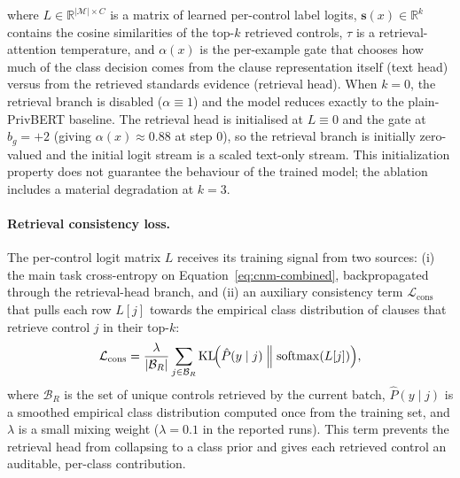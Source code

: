 \documentclass[final,3p,times,twocolumn]{elsarticle}
\begin{document}
	where $L \in \mathbb{R}^{|\mathcal{M}| \times C}$ is a matrix of learned per-control
	label logits, $\mathbf{s}(x) \in \mathbb{R}^{k}$ contains the cosine
	similarities of the top-$k$ retrieved controls, $\tau$ is a retrieval-attention
	temperature, and $\alpha(x)$ is the per-example gate that chooses how much of
	the class decision comes from the clause representation itself (text head)
	versus from the retrieved standards evidence (retrieval head). When $k = 0$,
	the retrieval branch is disabled ($\alpha \equiv 1$) and the model reduces
	exactly to the plain-PrivBERT baseline. The retrieval head is initialised at $L
	\equiv 0$ and the gate at $b_{g} = +2$ (giving $\alpha(x) \approx 0.88$ at
		step $0$), so the retrieval branch is initially zero-valued and the initial
		logit stream is a scaled text-only stream. This initialization property does
		not guarantee the behaviour of the trained model; the ablation includes a
		material degradation at $k=3$.

	\paragraph{Retrieval consistency loss.}
	The per-control logit matrix $L$ receives its training signal from two sources:
	(i) the main task cross-entropy on Equation~\ref{eq:cnm-combined}, backpropagated
	through the retrieval-head branch, and (ii) an auxiliary consistency term
	$\mathcal{L}_{\text{cons}}$ that pulls each row $L[j]$ towards the empirical
	class distribution of clauses that retrieve control $j$ in their top-$k$:
	\begin{equation}
		\mathcal{L}_{\text{cons}}= \frac{\lambda}{|\mathcal{B}_{R}|}\sum_{j \in
		\mathcal{B}_R}\mathrm{KL}\!\Bigl(\hat{P}(y \mid j) \;\Big\Vert\; \mathrm{softmax}
		(L[j])\Bigr), \label{eq:cnm-consistency}
	\end{equation}
	where $\mathcal{B}_{R}$ is the set of unique controls retrieved by the current
	batch, $\hat{P}(y \mid j)$ is a smoothed empirical class distribution computed
	once from the training set, and $\lambda$ is a small mixing weight ($\lambda =
	0.1$
	in the reported runs). This term prevents the retrieval head from collapsing
	to a class prior and gives each retrieved control an auditable, per-class contribution.
\end{document}
